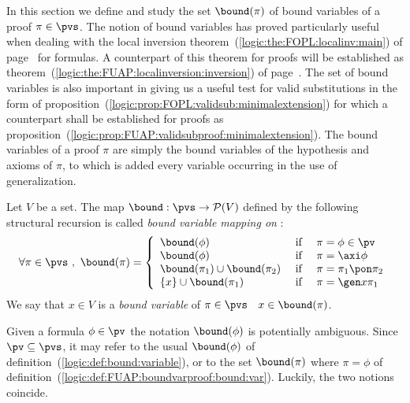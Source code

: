 In this section we define and study the set $\bound(\pi)$ of bound
variables of a proof $\pi\in\pvs$. The notion of bound variables has
proved particularly useful when dealing with the local inversion
theorem~(\ref{logic:the:FOPL:localinv:main}) of
page~\pageref{logic:the:FOPL:localinv:main} for formulas.  A
counterpart of this theorem for proofs will be established as
theorem~(\ref{logic:the:FUAP:localinversion:inversion}) of
page~\pageref{logic:the:FUAP:localinversion:inversion}. The set of
bound variables is also important in giving us a useful test for
valid substitutions in the form of
proposition~(\ref{logic:prop:FOPL:validsub:minimalextension}) for
which a counterpart shall be established for proofs as
proposition~(\ref{logic:prop:FUAP:validsubproof:minimalextension}).
The bound variables of a proof $\pi$ are simply the bound variables
of the hypothesis and axioms of $\pi$, to which is added every
variable occurring in the use of generalization.

\begin{defin}\label{logic:def:FUAP:boundvarproof:bound:var}
Let $V$ be a set. The map $\bound:\pvs\to {\cal P}(V)$ defined by
the following structural recursion is called {\em bound variable
mapping on \pvs}:
 \begin{equation}\label{logic:eqn:FUAP:boundvarproof:bound:var:1}
    \forall\pi\in\pvs\ ,\ \bound(\pi)=\left\{
                    \begin{array}{lcl}
                    \bound(\phi)&\mbox{\ if\ }&\pi=\phi\in\pv\\
                    \bound(\phi)&\mbox{\ if\ }&\pi=\axi\phi\\
                    \bound(\pi_{1})\cup\bound(\pi_{2}) &\mbox{\ if\ }&\pi=\pi_{1}\pon\pi_{2}\\
                    \{x\}\cup\bound(\pi_{1})&\mbox{\ if\ }&\pi=\gen x\pi_{1}
                    \end{array}\right.
    \end{equation}
We say that $x\in V$ is a {\em bound variable} of $\pi\in\pvs$
\ifand\ $x\in\bound(\pi)$.
\end{defin}
Given a formula $\phi\in\pv$ the notation $\bound(\phi)$ is
potentially ambiguous. Since $\pv\subseteq\pvs$, it may refer to the
usual $\bound(\phi)$ of definition~(\ref{logic:def:bound:variable}),
or to the set $\bound(\pi)$ where $\pi=\phi$ of
definition~(\ref{logic:def:FUAP:boundvarproof:bound:var}). Luckily,
the two notions coincide.


